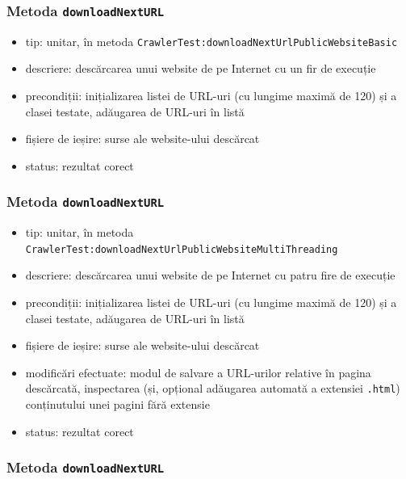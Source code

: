 \documentclass[12pt]{article}
\begin{document}
\subsubsection{Metoda \texttt{downloadNextURL}}

\begin{itemize}
    \item tip: unitar, în metoda \texttt{CrawlerTest:downloadNextUrlPublicWebsiteBasic}
    \item descriere: descărcarea unui website de pe Internet cu un fir de execuție
    \item precondiții: inițializarea listei de URL-uri (cu lungime maximă de 120) și a clasei testate, adăugarea de URL-uri în listă
    \item fișiere de ieșire: surse ale website-ului descărcat
    \item status: rezultat corect
\end{itemize}

\subsubsection{Metoda \texttt{downloadNextURL}}

\begin{itemize}
    \item tip: unitar, în metoda \\ \texttt{CrawlerTest:downloadNextUrlPublicWebsiteMultiThreading}
    \item descriere: descărcarea unui website de pe Internet cu patru fire de execuție
    \item precondiții: inițializarea listei de URL-uri (cu lungime maximă de 120) și a clasei testate, adăugarea de URL-uri în listă
    \item fișiere de ieșire: surse ale website-ului descărcat
    \item modificări efectuate: modul de salvare a URL-urilor relative în pagina descărcată, inspectarea (și, opțional adăugarea automată a extensiei \texttt{.html}) conținutului unei pagini fără extensie
    \item status: rezultat corect
\end{itemize}

\subsubsection{Metoda \texttt{downloadNextURL}}
\end{document}
